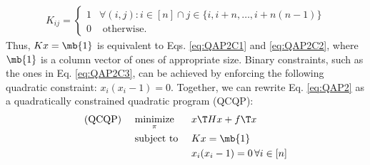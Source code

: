 \documentclass[10pt,journal,cspaper,compsoc]{IEEEtran}
\begin{document}
\begin{align}
	K_{ij}=
	\begin{cases}
		1 & \forall (i,j) : i \in [n] \cap j \in \{i,i+n,\ldots, i+n(n-1)\} \\
		0 & \text{ otherwise}.
	\end{cases}
\end{align}
Thus, $Kx=\mb{1}$ is equivalent to Eqs. \eqref{eq:QAP2C1} and \eqref{eq:QAP2C2}, where $\mb{1}$ is a column vector of ones of appropriate size. Binary constraints, such as the ones in Eq. \eqref{eq:QAP2C3}, can be achieved by enforcing the following quadratic constraint: $x_i(x_i-1)=0$.  Together, we can rewrite Eq. \eqref{eq:QAP2} as a quadratically constrained quadratic program (QCQP):
\begin{subequations} \label{eq:QCQP}
\begin{align}
	\text{(QCQP) } \quad &\underset{\pi}{\text{minimize}} && x\T H x + f\T x \\
	&\text{subject to } &&  Kx = \mb{1} \\
	&&& x_i  (x_i - 1) = 0 \, \forall i \in [n] \label{eq:QC}
\end{align}
\end{subequations}
\end{document}
